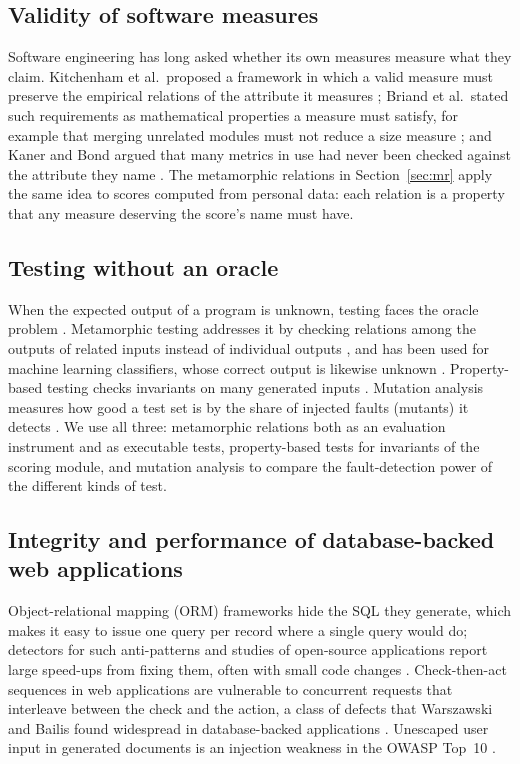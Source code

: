 \documentclass[12pt,a4paper]{article}
\begin{document}
\subsection{Validity of software measures}

Software engineering has long asked whether its own measures measure what they claim. Kitchenham et al.\ proposed a framework in which a valid measure must preserve the empirical relations of the attribute it measures \cite{kitchenham1995}; Briand et al.\ stated such requirements as mathematical properties a measure must satisfy, for example that merging unrelated modules must not reduce a size measure \cite{briand1996}; and Kaner and Bond argued that many metrics in use had never been checked against the attribute they name \cite{kaner2004}. The metamorphic relations in Section~\ref{sec:mr} apply the same idea to scores computed from personal data: each relation is a property that any measure deserving the score's name must have.

\subsection{Testing without an oracle}

When the expected output of a program is unknown, testing faces the oracle problem \cite{barr2015}. Metamorphic testing addresses it by checking relations among the outputs of related inputs instead of individual outputs \cite{chen1998,chen2018,segura2016}, and has been used for machine learning classifiers, whose correct output is likewise unknown \cite{xie2011}. Property-based testing checks invariants on many generated inputs \cite{claessen2000}. Mutation analysis measures how good a test set is by the share of injected faults (mutants) it detects \cite{jia2011,papadakis2019}. We use all three: metamorphic relations both as an evaluation instrument and as executable tests, property-based tests for invariants of the scoring module, and mutation analysis to compare the fault-detection power of the different kinds of test.

\subsection{Integrity and performance of database-backed web applications}

Object-relational mapping (ORM) frameworks hide the SQL they generate, which makes it easy to issue one query per record where a single query would do; detectors for such anti-patterns and studies of open-source applications report large speed-ups from fixing them, often with small code changes \cite{chen2014,yang2018}. Check-then-act sequences in web applications are vulnerable to concurrent requests that interleave between the check and the action, a class of defects that Warszawski and Bailis found widespread in database-backed applications \cite{warszawski2017}. Unescaped user input in generated documents is an injection weakness in the OWASP Top~10 \cite{owasp2021}.
\end{document}
